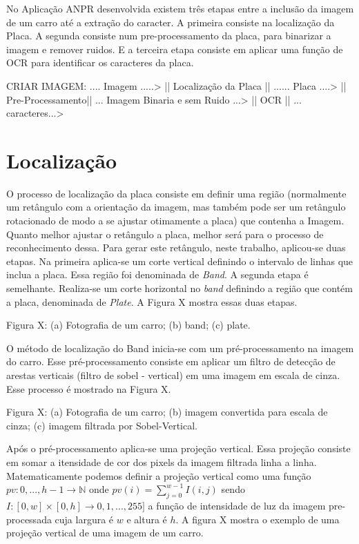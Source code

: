    No Aplicação ANPR desenvolvida existem três etapas entre a inclusão da imagem de um carro até a extração do caracter. A primeira consiste na localização da Placa. A segunda consiste num pre-processamento da placa, para binarizar a imagem e remover ruidos. E a terceira etapa consiste em aplicar uma função de OCR para identificar os caracteres da placa.

    CRIAR IMAGEM: .... Imagem .....> || Localização da Placa || ...... Placa ....> || Pre-Processamento||  ... Imagem Binaria e sem Ruido ...> || OCR || ... caracteres...>


    \section{Localização}
    O processo de localização da placa consiste em definir uma região (normalmente um retângulo com a orientação da imagem, mas também pode ser um retângulo rotacionado de modo a se ajustar otimamente a placa) que contenha a Imagem. Quanto melhor ajustar o retângulo a placa, melhor será para o processo de reconhecimento dessa. Para gerar este retângulo, neste trabalho, aplicou-se duas etapas. Na primeira aplica-se um corte vertical definindo o intervalo de linhas que inclua a placa. Essa região foi denominada de \textit{Band}. A segunda etapa é semelhante. Realiza-se um corte horizontal no \textit{band} definindo a região que contém a placa, denominada de \textit{Plate}. A Figura X mostra essas duas etapas.

    Figura X: (a) Fotografia de um carro; (b) band; (c) plate.

    O método de localização do Band inicia-se com um pré-processamento na imagem do carro. Esse pré-processamento consiste em aplicar um filtro de detecção de arestas verticais (filtro de sobel - vertical) em uma imagem em escala de cinza. Esse processo é mostrado na Figura X.

    Figura X: (a) Fotografia de um carro; (b) imagem convertida para escala de cinza; (c) imagem filtrada por Sobel-Vertical.

    Após o pré-processamento aplica-se uma projeção vertical. Essa projeção consiste em somar a itensidade de cor dos pixels da imagem filtrada linha a linha. Matematicamente podemos definir a projeção vertical como uma função $pv: {0,...,h-1}\longrightarrow \mathbb{N}$ onde $pv(i)=\sum_{j=0}^{w-1} I(i,j)$ sendo $I:[0, w]\times[0, h]\longrightarrow{0,1,...,255}]$ a função de intensidade de luz da imagem pre-processada cuja largura é $w$ e altura é $h$. A figura X mostra o exemplo de uma projeção vertical de uma imagem de um carro.


